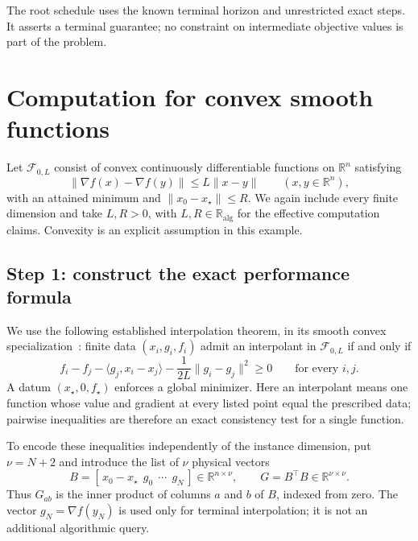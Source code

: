 \documentclass[11pt]{article}
\numberwithin{equation}{section}
\theoremstyle{definition}
\newcommand{\R}{\mathbb R}
\newcommand{\K}{\mathbb R_{\mathrm{alg}}}
\begin{document}
The root schedule uses the known terminal horizon and unrestricted exact steps. It asserts a terminal guarantee; no constraint on intermediate objective values is part of the problem.

\section{Computation for convex smooth functions}
\label{sec:smooth}
Let $\mathcal F_{0,L}$ consist of convex continuously differentiable functions on $\R^n$ satisfying
\begin{equation}
 \|\nabla f(x)-\nabla f(y)\|\le L\|x-y\|\qquad(x,y\in\R^n),
 \label{eq:smooth-class}
\end{equation}
with an attained minimum and $\|x_0-x_\star\|\le R$. We again include every finite dimension and take $L,R>0$, with $L,R\in\K$ for the effective computation claims. Convexity is an explicit assumption in this example.

\subsection{Step 1: construct the exact performance formula}
We use the following established interpolation theorem, in its smooth convex specialization~\cite[Corollary 1]{THG}: finite data $(x_i,g_i,f_i)$ admit an interpolant in $\mathcal F_{0,L}$ if and only if
\begin{equation}
 f_i-f_j-\langle g_j,x_i-x_j\rangle
 -\frac1{2L}\|g_i-g_j\|^2\ge0\qquad\text{for every }i,j.
 \label{eq:interpolation}
\end{equation}
A datum $(x_\star,0,f_\star)$ enforces a global minimizer. Here an interpolant means one function whose value and gradient at every listed point equal the prescribed data; pairwise inequalities are therefore an exact consistency test for a single function.

To encode these inequalities independently of the instance dimension, put $\nu=N+2$ and introduce the list of $\nu$ physical vectors
\begin{equation}
 B=[\,x_0-x_\star\ \ g_0\ \ \cdots\ \ g_N\,]\in\R^{n\times\nu},
 \qquad G=B^\top B\in\R^{\nu\times\nu}.
 \label{eq:Gram-definition}
\end{equation}
Thus $G_{ab}$ is the inner product of columns $a$ and $b$ of $B$, indexed from zero. The vector $g_N=\nabla f(y_N)$ is used only for terminal interpolation; it is not an additional algorithmic query.
\end{document}
